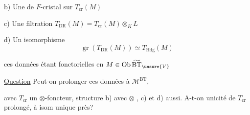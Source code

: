 b) Une   de $F$-cristal sur $T_{\mathrm{cr}}(M)$

c) Une filtration  $T_{\mathrm{DR}}(M)=T_{\mathrm{cr}}(M)\otimes_K L$

d) Un isomorphisme
\[
\operatorname{gr}(T_{\mathrm{DR}}(M))\simeq T_{\mathrm{Hdg}}(M)
\]

ces données étant fonctorielles en $M\in\operatorname{Ob}\widetilde{\mathrm{BT}}_{\unsure{V}}$

\uline{Question} Peut-on prolonger ces données à $\mathcal M^{\mathrm{BT}}$, 

avec $T_{\mathrm{cr}}$ un $\otimes$-foncteur,  structure b)  avec $\otimes$ , c) et d) aussi. A-t-on unicité de $T_{\mathrm{cr}}$ prolongé, à isom unique près?
